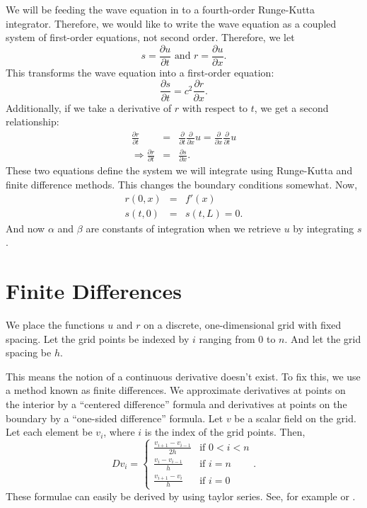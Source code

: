 \documentclass[]{article}
\begin{document}
We will be feeding the wave equation in to a fourth-order Runge-Kutta
integrator. Therefore, we would like to write the wave equation as a
coupled system of first-order equations, not second order. Therefore, we let
\begin{equation}
  \label{eq:r:s:def}
  s = \frac{\partial u}{\partial t}\text{ and }r = \frac{\partial u}{\partial x}.
\end{equation}
This transforms the wave equation into a first-order equation:
\begin{equation}
  \label{eq:wave:transformed:1}
  \frac{\partial s}{\partial t} = c^2 \frac{\partial r}{\partial x}.
\end{equation}
Additionally, if we take a derivative of $r$ with respect to $t$, we
get a second relationship:
\begin{eqnarray}
  \label{eq:wave:transformed:2}
  \frac{\partial r}{\partial t} &=& \frac{\partial}{\partial t}\frac{\partial }{\partial x}u = \frac{\partial }{\partial x}\frac{\partial }{\partial t}u\nonumber\\
  \Rightarrow \frac{\partial r}{\partial t} &=& \frac{\partial s}{\partial x}.
\end{eqnarray}
These two equations define the system we will integrate using
Runge-Kutta and finite difference methods. This changes the boundary
conditions somewhat. Now,
\begin{eqnarray}
  \label{eq:boundary:conditions:r:s}
  r(0,x) &=& f'(x)\\
  s(t,0) &=& s(t,L) = 0.
\end{eqnarray}
And now $\alpha$ and $\beta$ are constants of integration when we
retrieve $u$ by integrating $s$.

\section{Finite Differences}

We place the functions $u$ and $r$ on a discrete, one-dimensional grid
with fixed spacing. Let the grid points be indexed by $i$ ranging from
0 to $n$. And let the grid spacing be $h$.

This means the notion of a continuous derivative
doesn't exist. To fix this, we use a method known as finite
differences. We approximate derivatives at points on the interior by a
``centered difference'' formula and derivatives at points on the
boundary by a ``one-sided difference'' formula. Let $v$ be a scalar
field on the grid. Let each element be $v_i$, where $i$ is the index
of the grid points. Then,
\begin{equation}
  \label{eq:derivative:operator}
  D v_i = \begin{cases}
    \frac{v_{i+1} - v_{i-1}}{2h}&\text{if }0 < i < n\\
    \frac{v_i-v_{i-1}}{h}&\text{if }i = n\\
    \frac{v_{i+1}-v_i}{h}&\text{if }i = 0
  \end{cases}.
\end{equation}
These formulae can easily be derived by using taylor series. See, for
example \cite{wikifinitedifferences} or \cite{Heath}.
\end{document}
